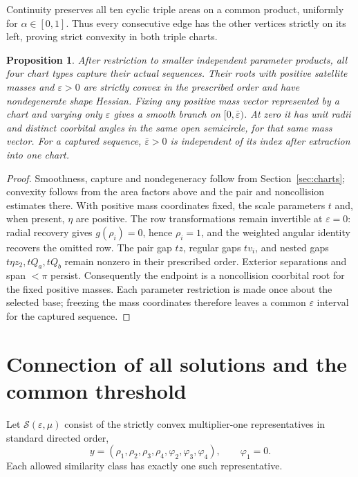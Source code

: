 \documentclass[11pt,a4paper]{article}
\numberwithin{equation}{section}
\newtheorem{proposition}[theorem]{Proposition}
\theoremstyle{remark}
\newcommand{\eps}{\varepsilon}
\begin{document}
Continuity preserves all ten cyclic triple areas on a common product, uniformly for $\alpha\in[0,1]$.
Thus every consecutive edge has the other vertices strictly on its left, proving strict convexity in both triple charts.

\begin{proposition}\label{prop:chart-interface}
After restriction to smaller independent parameter products, all four chart types capture their actual sequences. Their roots with positive satellite masses and $\eps>0$ are strictly convex in the prescribed order and have nondegenerate shape Hessian.
Fixing any positive mass vector represented by a chart and varying only $\eps$ gives a smooth branch on $[0,\bar\eps)$. At zero it has unit radii and distinct coorbital angles in the same open semicircle, for that same mass vector. For a captured sequence, $\bar\eps>0$ is independent of its index after extraction into one chart.
\end{proposition}
\begin{proof}
Smoothness, capture and nondegeneracy follow from Section~\ref{sec:charts}; convexity follows from the area factors above and the pair and noncollision estimates there.
With positive mass coordinates fixed, the scale parameters $t$ and, when present, $\eta$ are positive. The row transformations remain invertible at $\eps=0$: radial recovery gives $g(\rho_i)=0$, hence $\rho_i=1$, and the weighted angular identity recovers the omitted row.
The pair gap $tz$, regular gaps $tv_i$, and nested gaps $t\eta z_2,tQ_a,tQ_b$ remain nonzero in their prescribed order. Exterior separations and span $<\pi$ persist.
Consequently the endpoint is a noncollision coorbital root for the fixed positive masses.
Each parameter restriction is made once about the selected base; freezing the mass coordinates therefore leaves a common $\eps$ interval for the captured sequence.
\end{proof}

\section{Connection of all solutions and the common threshold}
\label{sec:global}
Let $\mathcal S(\eps,\mu)$ consist of the strictly convex multiplier-one representatives in standard directed order,
\[
 y=(\rho_1,\rho_2,\rho_3,\rho_4,\varphi_2,\varphi_3,\varphi_4),
 \qquad \varphi_1=0.
\]
Each allowed similarity class has exactly one such representative.
\end{document}
